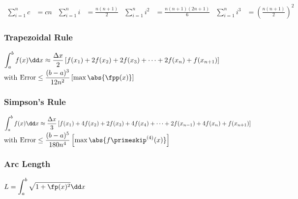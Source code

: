 \begin{align*}
\sum^n_{i=1}{c} &= cn
&
\sum^n_{i=1}{i} &= \frac{n(n+1)}{2}
&
\sum^n_{i=1}{i^2} &= \frac{n(n+1)(2n+1)}{6}
&
\sum^n_{i=1}{i^3} &= \left(\frac{n(n+1)}{2}\right)^2
\end{align*}

\vfill

\subsubsection*{Trapezoidal Rule}

\noindent$\ds\int_a^b{f(x)}\dd x \approx \frac{\Delta x}{2}\left[f(x_1)+2f(x_2) + 2f(x_3) + \dotsb + 2f(x_{n}) + f(x_{n+1})\right]$\smallskip\\
with  $\text{Error} \leq \dfrac{(b-a)^3}{12n^2}\left[ \max \abs{\fpp(x)}\right]$

\vfill

\subsubsection*{Simpson's Rule}

\noindent$\ds\int_a^b{f(x)}\dd x \approx \frac{\Delta x}{3}\left[f(x_1)+4f(x_2) + 2f(x_3) + 4f(x_4) + \dotsb + 2f(x_{n-1}) + 4f(x_{n}) + f(x_{n+1})\right] 
$\smallskip\\
with $\text{Error} \leq \dfrac{(b-a)^5}{180n^4}\left[ \max \abs{f\primeskip^{(4)}(x)}\right]$

\vfill

\subsubsection*{Arc Length}

\noindent
$\ds L = \int_a^b{\sqrt{1+ \fp(x)^2}}\dd x$

\vfill


